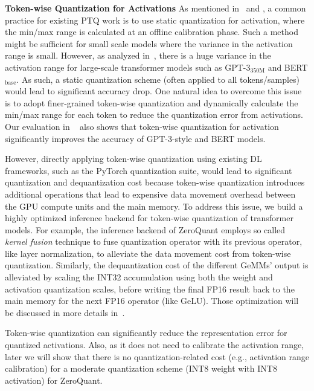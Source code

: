 \textbf{Token-wise Quantization for Activations} As mentioned in~ and , a common practice for existing PTQ work is to use static quantization for activation, where the min/max range is calculated at an offline calibration phase. Such a method might be sufficient for small scale models where the variance in the activation range is small. However, as analyzed in~, there is a huge variance in the activation range for large-scale transformer models such as GPT-3$_{\text{350M}}$ and BERT$_\text{base}$. 
As such, a static quantization scheme (often applied to all tokens/samples) would lead to significant accuracy drop. One natural idea to overcome this issue is to adopt finer-grained token-wise quantization and dynamically calculate the min/max range for each token to reduce the quantization error from activations. Our evaluation in ~ also shows that token-wise quantization for activation significantly improves the accuracy of GPT-3-style and BERT models. 

However, directly applying token-wise quantization using existing DL frameworks, such as the PyTorch quantization suite, would lead to significant quantization and dequantization cost because token-wise quantization introduces additional operations that lead to expensive data movement overhead between the GPU compute units and the main memory. To address this issue, we build a highly optimized inference backend for token-wise quantization of transformer models. For example, the inference backend of ZeroQuant employs so called \emph{kernel fusion} technique to fuse quantization operator with its previous operator, like layer normalization, to alleviate the data movement cost from token-wise quantization. Similarly, the dequantization cost of the different GeMMs' output is alleviated by scaling the INT32 accumulation using both the weight and activation quantization scales, before writing the final FP16 result back to the main memory for the next FP16 operator (like GeLU). Those optimization will be discussed in more details in~.

Token-wise quantization can significantly reduce the representation error for quantized activations. Also, as it does not need to calibrate the activation range, later we will show that there is no quantization-related cost (e.g., activation range calibration) for a moderate quantization scheme (INT8 weight with INT8 activation) for ZeroQuant.


